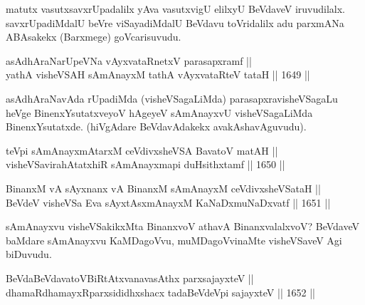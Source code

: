 \begin{artha}
matutx vasutxsavxrUpadalilx yAva vasutxvigU elilxyU BeVdaveV iruvudilalx. savxrUpadiMdalU beVre viSayadiMdalU BeVdavu toVridalilx adu parxmANa ABAsakekx (Barxmege) goVcarisuvudu.
\end{artha}


\begin{shl}
asAdhAraNarUpeVNa vAyxvataRnetxV parasapxramf || \\
yathA visheVSAH sAmAnayxM tathA vAyxvataRteV tataH \hfill || 1649 ||  
\end{shl}

\begin{artha}
asAdhAraNavAda rUpadiMda (visheVSagaLiMda) parasapxravisheVSagaLu heVge BinenxYsutatxveyoV hAgeyeV sAmAnayxvU visheVSagaLiMda BinenxYsutatxde. (hiVgAdare BeVdavAdakekx avakAshavAguvudu).
\end{artha}

\begin{shl}
teV\s pi sAmAnayxmAtarxM ceVdivxsheVSA BavatoV matAH || \\
visheVSavirahAtatxhiR sAmAnayxmapi duHsithxtamf \hfill || 1650 ||  
\end{shl}


\begin{shl}
BinanxM vA sAyxnanx vA BinanxM sAmAnayxM ceVdivxsheVSataH ||  \\
BeVdeV visheVSa Eva sAyxtAsxmAnayxM KaNaDxmuNaDxvatf \hfill || 1651 ||  
\end{shl}

\begin{artha}
sAmAnayxvu visheVSakikxMta BinanxvoV athavA BinanxvalalxvoV? BeVdaveV baMdare sAmAnayxvu KaMDagoVvu, muMDagoVvinaMte visheVSaveV Agi biDuvudu.
\end{artha}


\begin{shl}
\footnotemark[1]BeVdaBeVdavatoVBiRtAtxvanavasAthx parxsajayxteV ||  \\
dhamaRdhamayxRparxsididhxshacx tadaBeVdeV\s pi sajayxteV \hfill || 1652 || 
\end{shl}

